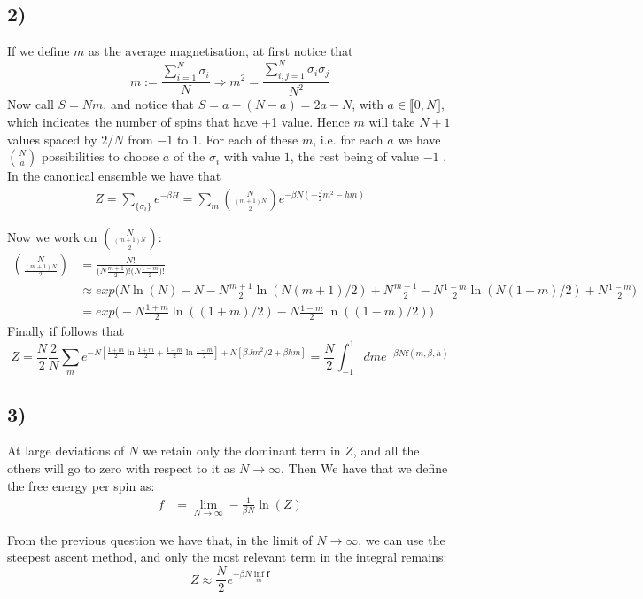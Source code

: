 \documentclass[10pt,a4paper]{book}
\begin{document}
\subsection*{2)}
If we define $m$ as the average magnetisation, at first notice that 
$$m:=\frac{\sum_{i=1}^N\sigma_i}{N} \Rightarrow m^2=\frac{\sum_{i,j=1}^N\sigma_i\sigma_j}{N^2}$$
Now call $S=Nm$, and notice that $S=a-(N-a)=2a-N$, with $a\in\llbracket 0,N\rrbracket$, which indicates the number of spins that have +1 value. Hence $m$ will take $N+1$ values spaced by $2/N$ from $-1$ to $1$. For each of these $m$, i.e. for each $a$ we have $\binom{N}{a}$ possibilities to choose $a$ of the $\sigma_i$ with value $1$, the rest being of value $-1$ . In the canonical ensemble we have that 
\begin{align*}
Z=\sum_{\{\sigma_i\}} e^{-\beta H}=\sum_{m} \binom{N}{\frac{(m+1)N}{2}}e^{-\beta N(-\frac{J}{2}m^2-hm)}
\end{align*}

Now we work on $\binom{N}{\frac{(m+1)N}{2}}$:
\begin{align*}
\binom{N}{\frac{(m+1)N}{2}}&=\frac{N!}{\big(N\frac{m+1}{2}\big)!\big(N\frac{1-m}{2}\big)!}\\
&\approx exp\bigg(N\ln(N)-N-N\frac{m+1}{2}\ln(N(m+1)/2)+N\frac{m+1}{2}-N\frac{1-m}{2}\ln(N(1-m)/2)+N\frac{1-m}{2}\bigg)\\
&=exp\bigg(-N\frac{1+m}{2}\ln((1+m)/2)-N\frac{1-m}{2}\ln((1-m)/2)\bigg)
\end{align*}
Finally if follows that 
$$Z=\frac{N}{2}\frac{2}{N}\sum_m e^{-N[\frac{1+m}{2}\ln\frac{1+m}{2}+\frac{1-m}{2}\ln\frac{1-m}{2}]+N[\beta Jm^2/2+\beta hm]}=\frac{N}{2}\int_{-1}^{1}dme^{-\beta N\mathbf{f}(m,\beta,h)}$$



\subsection*{3)}
At large deviations of $N$ we retain only the dominant term in $Z$, and all the others will go to zero with respect to it as $N\to\infty$. Then 
We have that we define the free energy per spin as:
\begin{align*}
f&=\lim_{N\to\infty}-\frac{1}{\beta N}\ln(Z)
\end{align*}

From the previous question we have that, in the limit of $N\to \infty$, we can use the steepest ascent method, and only the most relevant term in the integral remains:
$$Z\approx \frac{N}{2} e^{-\beta N\inf_m\mathbf{f}}$$
\end{document}
